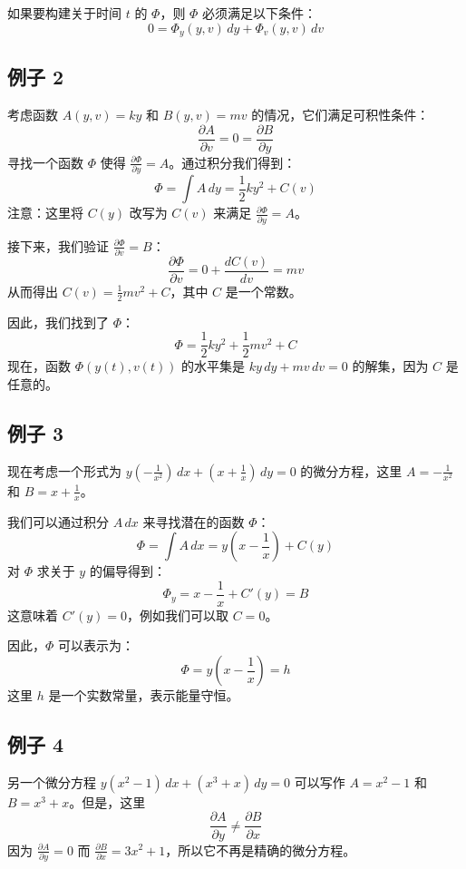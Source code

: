\documentclass{ctexart}
\begin{document}
如果要构建关于时间 \( t \) 的 \( \Phi \)，则 \( \Phi \) 必须满足以下条件：
\[
0 = \Phi_y(y,v) \, dy + \Phi_v(y,v) \, dv
\]



\subsection*{例子 2}
考虑函数 \( A(y,v) = ky \) 和 \( B(y,v) = mv \) 的情况，它们满足可积性条件：
\[
\frac{\partial A}{\partial v} = 0 = \frac{\partial B}{\partial y}
\]
寻找一个函数 \( \Phi \) 使得 \( \frac{\partial \Phi}{\partial y} = A \)。通过积分我们得到：
\[
\Phi = \int A \, dy = \frac{1}{2} k y^2 + C(v)
\]
注意：这里将 \( C(y) \) 改写为 \( C(v) \) 来满足 \( \frac{\partial \Phi}{\partial y} = A \)。

接下来，我们验证 \( \frac{\partial \Phi}{\partial v} = B \)：
\[
\frac{\partial \Phi}{\partial v} = 0 + \frac{d C(v)}{dv} = mv
\]
从而得出 \( C(v) = \frac{1}{2} m v^2 + C \)，其中 \( C \) 是一个常数。

因此，我们找到了 \( \Phi \)：
\[
\Phi = \frac{1}{2} k y^2 + \frac{1}{2} m v^2 + C
\]
现在，函数 \( \Phi(y(t),v(t)) \) 的水平集是 \( ky \, dy + mv \, dv = 0 \) 的解集，因为 \( C \) 是任意的。

\subsection*{例子 3}
现在考虑一个形式为 \( y(-\frac{1}{x^2}) \, dx + (x + \frac{1}{x}) \, dy = 0 \) 的微分方程，这里 \( A = -\frac{1}{x^2} \) 和 \( B = x + \frac{1}{x} \)。

我们可以通过积分 \( A \, dx \) 来寻找潜在的函数 \( \Phi \)：
\[
\Phi = \int A \, dx = y(x - \frac{1}{x}) + C(y)
\]
对 \( \Phi \) 求关于 \( y \) 的偏导得到：
\[
\Phi_y = x - \frac{1}{x} + C'(y) = B
\]
这意味着 \( C'(y) = 0 \)，例如我们可以取 \( C = 0 \)。

因此，\( \Phi \) 可以表示为：
\[
\Phi = y(x - \frac{1}{x}) = h
\]
这里 \( h \) 是一个实数常量，表示能量守恒。

\subsection*{例子 4}
另一个微分方程 \( y(x^2 - 1) \, dx + (x^3 + x) \, dy = 0 \) 可以写作 \( A = x^2 - 1 \) 和 \( B = x^3 + x \)。但是，这里
\[
\frac{\partial A}{\partial y} \neq \frac{\partial B}{\partial x}
\]
因为 \( \frac{\partial A}{\partial y} = 0 \) 而 \( \frac{\partial B}{\partial x} = 3x^2 + 1 \)，所以它不再是精确的微分方程。
\end{document}
